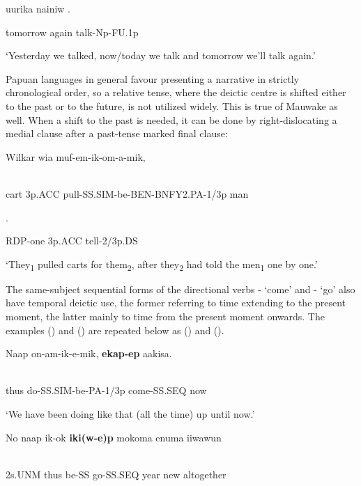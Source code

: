 uurika  nainiw  .

tomorrow  again  talk-Np-FU.1p

`Yesterday we talked, now/today we talk and tomorrow we'll talk again.'

Papuan languages in general favour presenting a narrative in strictly chronological order, so a relative tense, where the deictic centre is shifted either to the past or to the future, is not utilized widely. This is true of Mauwake as well. When a shift to the past is needed, it can be done by right-dislocating a medial clause after a past-tense marked final clause: 

\ea%
\label{ex:x1268}
\gll Wilkar  wia  muf-em-ik-om-a-mik,   \\
      \\
\glt
\z

cart  3p.ACC  pull-SS.SIM-be-BEN-BNFY2.PA-1/3p  man  

  .

RDP-one  3p.ACC  tell-2/3p.DS

`They\textsubscript{1} pulled carts for them\textsubscript{2}, after they\textsubscript{2} had told the men\textsubscript{1} one by one.'

The same-subject sequential forms of the directional verbs - `come' and - `go' also have temporal deictic use, the former referring to time extending to the present moment, the latter mainly to time from the present moment onwards. The examples () and () are repeated below as () and ().

\ea%
\label{ex:x1941}
\gll Naap  on-am-ik-e-mik,  \textbf{ekap-ep } aakisa. \\
      \\
\glt
\z

thus  do-SS.SIM-be-PA-1/3p  come-SS.SEQ  now

`We have been doing like that (all the time) up until now.'

\ea%
\label{ex:x1942}
\gll No  naap  ik-ok  \textbf{iki(w-e)p}  mokoma  enuma  iiwawun \\
      \\
\glt
\z

2s.UNM  thus  be-SS  go-SS.SEQ  year  new  altogether

